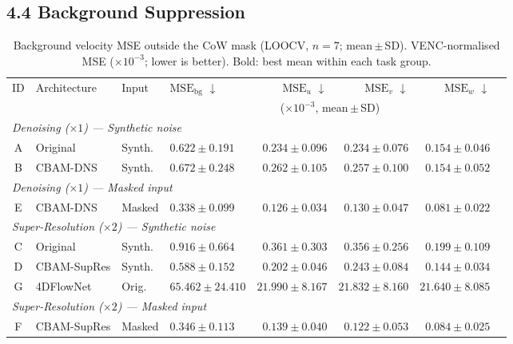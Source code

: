 \documentclass[11pt]{article}
\begin{document}
\subsection*{4.4 Background Suppression}

\begin{table}[!htbp]
  \centering
  \caption{Background velocity MSE outside the CoW mask (LOOCV, $n=7$; mean\,$\pm$\,SD).
  VENC-normalised MSE ($\times 10^{-3}$; lower is better). Bold: best mean within each
  task group.}
  \label{tab:background}
  \setlength{\tabcolsep}{4pt}
  \small
  \begin{tabular}{clll rrrr}
    \toprule
    ID & Architecture & Input &
      $\text{MSE}_{\text{bg}}$ $\downarrow$ &
      $\text{MSE}_{u}$ $\downarrow$ &
      $\text{MSE}_{v}$ $\downarrow$ &
      $\text{MSE}_{w}$ $\downarrow$ \\
    & & & \multicolumn{4}{c}{($\times 10^{-3}$, mean\,$\pm$\,SD)} \\
    \midrule
    \multicolumn{7}{l}{\textit{Denoising ($\times 1$) --- Synthetic noise}} \\
    \midrule
    A & Original  & Synth. & $0.622 \pm 0.191$ & $0.234 \pm 0.096$ & $0.234 \pm 0.076$ & $0.154 \pm 0.046$ \\
    B & CBAM-DNS  & Synth. & $0.672 \pm 0.248$ & $0.262 \pm 0.105$ & $0.257 \pm 0.100$ & $0.154 \pm 0.052$ \\
    \multicolumn{7}{l}{\textit{Denoising ($\times 1$) --- Masked input}} \\
    \midrule
    E & CBAM-DNS  & Masked & $\mathbf{0.338 \pm 0.099}$ & $\mathbf{0.126 \pm 0.034}$ & $\mathbf{0.130 \pm 0.047}$ & $\mathbf{0.081 \pm 0.022}$ \\
    \midrule
    \multicolumn{7}{l}{\textit{Super-Resolution ($\times 2$) --- Synthetic noise}} \\
    \midrule
    C & Original    & Synth. & $0.916 \pm 0.664$ & $0.361 \pm 0.303$ & $0.356 \pm 0.256$ & $0.199 \pm 0.109$ \\
    D & CBAM-SupRes & Synth. & $0.588 \pm 0.152$ & $0.202 \pm 0.046$ & $0.243 \pm 0.084$ & $0.144 \pm 0.034$ \\
    G & 4DFlowNet   & Orig.  & $65.462 \pm 24.410$ & $21.990 \pm 8.167$ & $21.832 \pm 8.160$ & $21.640 \pm 8.085$ \\
    \multicolumn{7}{l}{\textit{Super-Resolution ($\times 2$) --- Masked input}} \\
    \midrule
    F & CBAM-SupRes & Masked & $\mathbf{0.346 \pm 0.113}$ & $\mathbf{0.139 \pm 0.040}$ & $\mathbf{0.122 \pm 0.053}$ & $\mathbf{0.084 \pm 0.025}$ \\
    \bottomrule
  \end{tabular}
\end{table}
\end{document}

